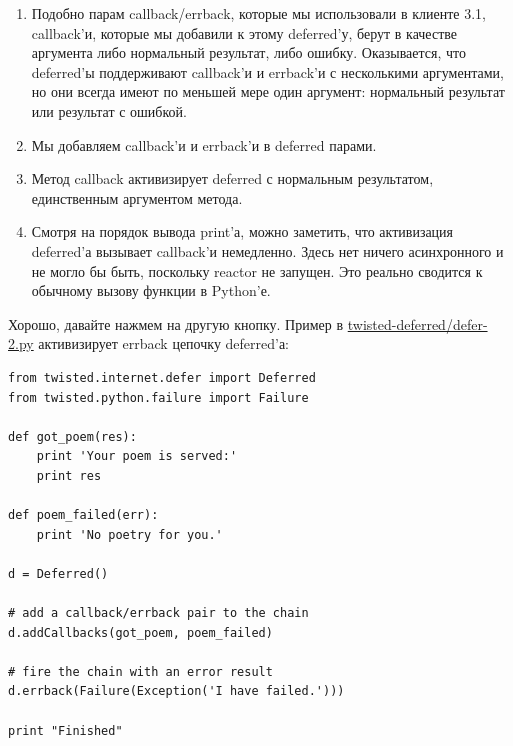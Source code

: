 \begin{enumerate}
\item Подобно парам callback/errback, которые мы использовали в 
клиенте 3.1, callback'и, которые мы добавили к этому deferred'у, 
берут в качестве аргумента либо нормальный результат, либо ошибку. 
Оказывается, что deferred'ы поддерживают callback'и и errback'и 
с несколькими аргументами, но они всегда имеют по меньшей мере 
один аргумент: нормальный результат или результат с ошибкой.

\item Мы добавляем callback'и и errback'и в deferred парами.

\item Метод callback активизирует deferred с нормальным результатом, 
единственным аргументом метода.

\item Смотря на порядок вывода print'а, можно заметить, 
что активизация deferred'а вызывает callback'и немедленно. 
Здесь нет ничего асинхронного и не могло бы быть, поскольку 
reactor не запущен. Это реально сводится к обычному вызову 
функции в Python'е.

\end{enumerate}

Хорошо, давайте нажмем на другую кнопку. Пример в 
\href{http://github.com/jdavisp3/twisted-intro/blob/master/twisted-deferred/defer-2.py}{twisted-deferred/defer-2.py} 
активизирует errback цепочку deferred'а:

\begin{scriptsize}\begin{verbatim}
from twisted.internet.defer import Deferred
from twisted.python.failure import Failure

def got_poem(res):
    print 'Your poem is served:'
    print res

def poem_failed(err):
    print 'No poetry for you.'

d = Deferred()

# add a callback/errback pair to the chain
d.addCallbacks(got_poem, poem_failed)

# fire the chain with an error result
d.errback(Failure(Exception('I have failed.')))

print "Finished"
\end{verbatim}\end{scriptsize}


